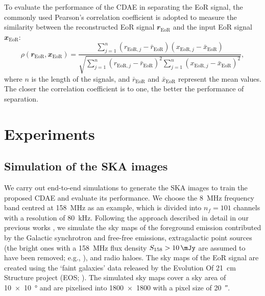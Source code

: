 \documentclass[letters,fleqn,usenatbib,onecolumn]{mnras}
\newcommand{\R}[1]{\mathrm{#1}}
\newcommand{\B}[1]{\mathbfit{#1}}
\begin{document}
To evaluate the performance of the CDAE in separating the EoR signal,
the commonly used Pearson's correlation coefficient
\citep[e.g.,][]{harker2009,chapman2013}
is adopted to measure the similarity between the reconstructed EoR
signal $\B{r}_{\R{EoR}}$ and the input EoR signal $\B{x}_{\R{EoR}}$:
\begin{equation}
  \label{eq:corrcoef}
  \rho(\B{r}_{\R{EoR}}, \B{x}_{\R{EoR}}) =
    \frac{\sum_{j=1}^{n}(r_{\R{EoR},j} - \bar{r}_{\R{EoR}})
      (x_{\R{EoR},j} - \bar{x}_{\R{EoR}})}{
        \sqrt{\sum_{j=1}^{n}(r_{\R{EoR},j} - \bar{r}_{\R{EoR}})^2
          \sum_{j=1}^{n}(x_{\R{EoR},j} - \bar{x}_{\R{EoR}})^2}
    },
\end{equation}
where $n$ is the length of the signals,
and $\bar{r}_{\R{EoR}}$ and $\bar{x}_{\R{EoR}}$ represent the mean values.
The closer the correlation coefficient is to one, the better the
performance of separation.


\section{Experiments}
\label{sec:experiments}

\subsection{Simulation of the SKA images}
\label{sec:simulation}

We carry out end-to-end simulations to generate the SKA images to
train the proposed CDAE and evaluate its performance.
We choose the \SI{8}{\MHz} frequency band centred at \SI{158}{\MHz} as
an example, which is divided into $n_f = 101$ channels with a resolution
of \SI{80}{\kHz}.
Following the approach described in detail in our previous works
\citep{wang2010,wang2013}, we simulate the sky maps of the foreground
emission contributed by the Galactic synchrotron and free-free
emissions, extragalactic point sources (the bright ones with a
\SI{158}{\MHz} flux density $S_{158} > \SI{10}{\mJy}$ are assumed to
have been removed; e.g., \citealt{liu2009ps}), and radio haloes.
The sky maps of the EoR signal are created using the `faint galaxies'
data released by the Evolution Of 21~cm Structure project
(EOS; \citealt{mesinger2016}).
The simulated sky maps cover a sky area of \SI{10 x 10}{\degree} and are
pixelised into \num{1800 x 1800} with a pixel size of \SI{20}{\arcsecond}.
\end{document}

